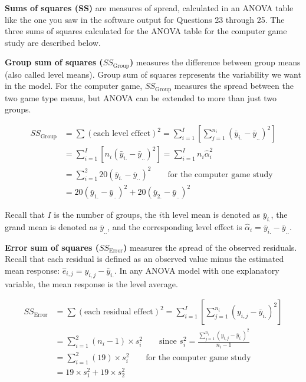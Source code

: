 \documentclass[
]{book}
\begin{document}
\textbf{Sums of squares (SS)} are measures of spread, calculated in an ANOVA table like the one you saw in the software output for Questions 23 through 25. The three sums of squares calculated for the ANOVA table for the computer game study are described below.

\textbf{Group sum of squares (\(SS_{\text{Group}}\))} measures the difference between group means (also called level means). Group sum of squares represents the variability we want in the model. For the computer game, \(SS_{\text{Group}}\) measures the spread between the two game type means, but ANOVA can be extended to more than just two groups.

\begin{equation}
\label{2_10}
\begin{split}
SS_{\text{Group}} & = \sum (\text{each level effect})^2 
    = \sum_{i=1}^{I} \left[ \sum_{j=1}^{n_i} (\bar{y}_{i.} - \bar{y}_{..})^2 \right]\\
    & = \sum_{i=1}^{I} \left[ n_i (\bar{y}_{i.} - \bar{y}_{..})^2 \right] 
    = \sum_{i=1}^{I} n_i \hat{\alpha}_i^2 \\
    &  = \sum_{i=1}^{2} 20 (\bar{y}_{i.} - \bar{y}_{..})^2 
                  \qquad \text{for the computer game study} \\
    & = 20 (\bar{y}_{1.} - \bar{y}_{..})^2 + 20 (\bar{y}_{2.} - \bar{y}_{..})^2
\end{split}
\tag{2.10}
\end{equation}

Recall that \(I\) is the number of groups, the \(i\)th level mean is denoted as \(\bar{y}_{i.}\), the grand mean is denoted as \(\bar{y}_{..}\), and the corresponding level effect is \(\hat{\alpha}_i = \bar{y}_{i.} - \bar{y}_{..}\).

\textbf{Error sum of squares (\(SS_{\text{Error}}\))} measures the spread of the observed residuals. Recall that each residual is defined as an observed value minus the estimated mean response: \(\hat{e}_{i,j} = y_{i,j} - \bar{y}_{i.}\). In any ANOVA model with one explanatory variable, the mean response is the level average.

\begin{equation}
\label{2_11}
\begin{split}
SS_{\text{Error}} & = \sum (\text{each residual effect})^2 
                    = \sum_{i=1}^{I} \left[ \sum_{j=1}^{n_i} (y_{i,j} - \bar{y}_{i.})^2  \right] \\
                  & = \sum_{i=1}^{2} (n_i - 1) \times s_i^2 
                    \qquad \text{since } s_i^2 = \frac{\sum_{j=1}^{n_i} (y_{i,j} - \bar{y}_{i.})^2}{n_i - 1} \\
                  & = \sum_{i=1}^{2} (19) \times s_i^2 
                    \qquad \text{for the computer game study} \\
                  & = 19 \times s_1^2 + 19 \times s_2^2
\end{split}
\tag{2.11}
\end{equation}
\end{document}
